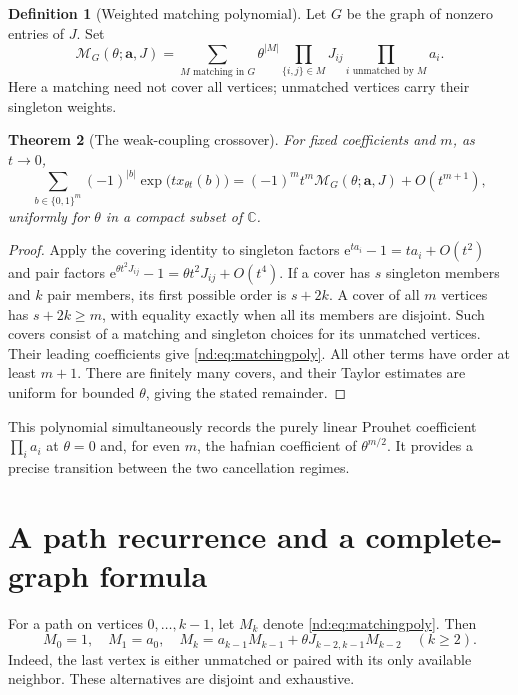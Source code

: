 \documentclass[11pt,a4paper,oneside,openany]{book}
\numberwithin{equation}{chapter}
\newtheorem{theorem}{Theorem}[chapter]
\theoremstyle{definition}
\newtheorem{definition}[theorem]{Definition}
\theoremstyle{remark}
\newcommand{\CC}{\mathbb C}
\newcommand{\e}{\mathrm e}
\newcommand{\MM}{\mathcal M}
\newcommand{\bits}{\{0,1\}}
\begin{document}
\begin{definition}[Weighted matching polynomial]
Let \(G\) be the graph of nonzero entries of \(J\). Set
\begin{equation}
 \MM_G(\theta;\bm a,J)
 =\sum_{M\text{ matching in }G}
      \theta^{|M|}\prod_{\{i,j\}\in M}J_{ij}
      \prod_{i\text{ unmatched by }M}a_i.
 \label{nd:eq:matchingpoly}
\end{equation}
Here a matching need not cover all vertices; unmatched vertices carry their
singleton weights.
\end{definition}

\begin{theorem}[The weak-coupling crossover]
\label{nd:thm:crossover}
For fixed coefficients and \(m\), as \(t\to0\),
\begin{equation}
 \sum_{b\in\bits^m}(-1)^{|b|}\exp\bigl(t x_{\theta t}(b)\bigr)
 =(-1)^m t^m\MM_G(\theta;\bm a,J)+O(t^{m+1}),
 \label{nd:eq:crossover}
\end{equation}
uniformly for \(\theta\) in a compact subset of \(\CC\).
\end{theorem}
\begin{proof}
Apply the covering identity to singleton factors
\(\e^{ta_i}-1=ta_i+O(t^2)\) and pair factors
\(\e^{\theta t^2J_{ij}}-1=\theta t^2J_{ij}+O(t^4)\).
If a cover has \(s\) singleton members and \(k\) pair members, its first
possible order is \(s+2k\). A cover of all \(m\) vertices has
\(s+2k\ge m\), with equality exactly when all its members are disjoint.
Such covers consist of a matching and singleton choices for its unmatched
vertices. Their leading coefficients give \eqref{nd:eq:matchingpoly}.
All other terms have order at least \(m+1\). There are finitely many covers,
and their Taylor estimates are uniform for bounded \(\theta\), giving the
stated remainder.
\end{proof}

This polynomial simultaneously records the purely linear Prouhet coefficient
\(\prod_i a_i\) at \(\theta=0\) and, for even \(m\), the hafnian coefficient
of \(\theta^{m/2}\). It provides a precise transition between the two
cancellation regimes.

\section{A path recurrence and a complete-graph formula}
For a path on vertices \(0,\ldots,k-1\), let \(M_k\) denote
\eqref{nd:eq:matchingpoly}. Then
\begin{equation}
 M_0=1,\quad M_1=a_0,\quad
 M_k=a_{k-1}M_{k-1}+\theta J_{k-2,k-1}M_{k-2}\quad(k\ge2).
 \label{nd:eq:pathmatchrec}
\end{equation}
Indeed, the last vertex is either unmatched or paired with its only available
neighbor. These alternatives are disjoint and exhaustive.
\end{document}
